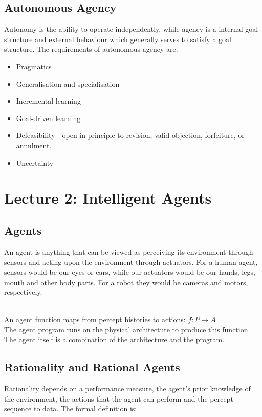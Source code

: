 \documentclass[11pt, oneside]{article}   	%
\begin{document}
\subsection{Autonomous Agency}
Autonomy is the ability to operate independently, while agency is a internal goal structure and external behaviour which generally serves to satisfy a goal structure. The requirements of autonomous agency are:
\begin{itemize}
\item Pragmatics
\item Generalisation and specialisation
\item Incremental learning
\item Goal-driven learning
\item Defeasibility - open in principle to revision, valid objection, forfeiture, or annulment.
\item Uncertainty
\end{itemize}

\section{Lecture 2: Intelligent Agents}

\subsection{Agents}

An agent is anything that can be viewed as perceiving its environment through sensors and acting upon the environment through actuators. For a human agent, sensors would be our eyes or ears, while our actuators would be our hands, legs, mouth and other body parts. For a robot they would be cameras and motors, respectively.

\\
An agent function maps from percept histories to actions: $f: P \rightarrow A$\\
The agent program runs on the physical architecture to produce this function.\\
The agent itself is a combination of the architecture and the program.\\

\subsection{Rationality and Rational Agents}

Rationality depends on a performance measure, the agent's prior knowledge of the environment, the actions that the agent can perform and the percept sequence to data. The formal definition is: 
\end{document}
